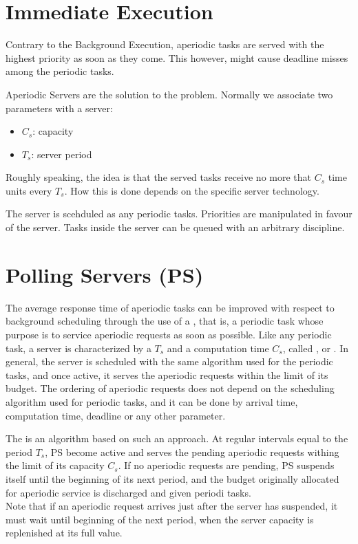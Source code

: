 \section{Immediate Execution}
Contrary to the Background Execution, aperiodic tasks are served with the highest priority as soon as they come. This however, might cause deadline misses among the periodic tasks.

Aperiodic Servers are the solution to the problem. Normally we associate two parameters with a server:
\begin{itemize}
    \item $C_s$: capacity
    \item $T_s$: server period
\end{itemize}
Roughly speaking, the idea is that the served tasks receive no more that $C_s$ time units every $T_s$. How this is done depends on the specific server technology.

The server is scehduled as any periodic tasks. Priorities are manipulated in favour of the server. Tasks inside the server can be queued with an arbitrary discipline.
\section{Polling Servers (PS)}
The average response time of aperiodic tasks can be improved with respect to background scheduling through the use of a , that is, a periodic task whose purpose is to service aperiodic requests as soon as possible. Like any periodic task, a server is characterized by a  $T_s$ and a computation time $C_s$, called , or . In general, the server is scheduled with the same algorithm used for the periodic tasks, and once active, it serves the aperiodic requests within the limit of its budget. The ordering of aperiodic requests does not depend on the scheduling algorithm used for periodic tasks, and it can be done by arrival time, computation time, deadline or any other parameter.


The  is an algorithm based on such an approach. At regular intervals equal to the period $T_s$, PS become active and serves the pending aperiodic requests withing the limit of its capacity $C_s$. If no aperiodic requests are pending, PS suspends itself until the beginning of its next period, and the budget originally allocated for aperiodic service is discharged and given periodi tasks.\\
Note that if an aperiodic request arrives just after the server has suspended, it must wait until beginning of the next period, when the server capacity is replenished at its full value.

